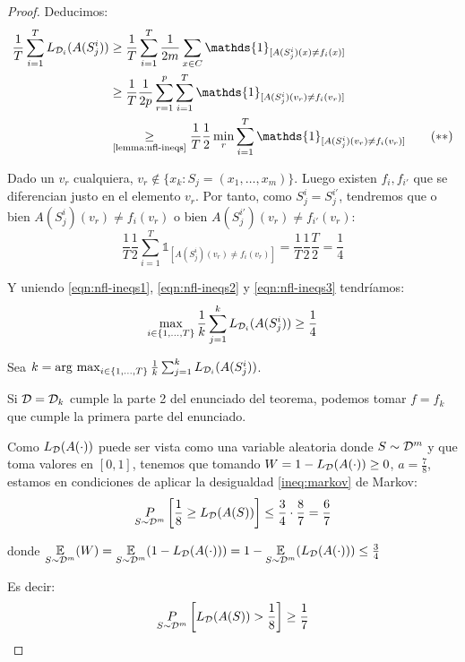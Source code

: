 \begin{proof}
Deducimos:
\begin{align}
\frac{1}{T} \sum_{i=1}^{T}  L_{\dist_i} (A(S_j^i)) &\ge
\frac{1}{T} \sum_{i=1}^{T}  \frac{1}{2m} \sum_{x \in C} \mathds{1}_{[A(S^i_j)(x) \neq f_i(x)]}\nonumber\\
&\ge \frac{1}{T} \frac{1}{2p} \sum_{r=1}^p \sum_{i=1}^{T}  \mathds{1}_{[A(S^i_j)(v_r) \neq f_i(v_r)]} \nonumber\\
&\underset{\textrm{\ref{lemma:nfl-ineqs}}}{\ge} \frac{1}{T} \frac{1}{2} \min_{r} \sum_{i=1}^{T}  \mathds{1}_{[A(S^i_j)(v_r) \neq f_i(v_r)]} 
\label{eqn:nfl-ineqs2}\tag{$\ast$$\ast$}
\end{align}


Dado un $v_r$ cualquiera, $v_r \notin \bigg\{x_k: S_j = (x_1, \ldots, x_m)\bigg\}$. Luego existen 
$f_i, f_{i'}$ que se diferencian justo en el elemento $v_r$. Por tanto, como $S_j^i = S_j^{i'}$,
tendremos que o bien $A(S^i_j)(v_r) \neq f_i(v_r)$ o bien $A(S^{i'}_j)(v_r) \neq f_{i'}(v_r)$:
\begin{equation}
\frac{1}{T} \frac{1}{2} \sum_{i=1}^{T}  \mathds{1}_{[A(S^i_j)(v_r) \neq f_i(v_r)]} = 
  \frac{1}{T} \frac{1}{2} \frac{T}{2} = \frac{1}{4}
\label{eqn:nfl-ineqs3}\tag{$\ast$$\ast$$\ast$}
\end{equation}

Y uniendo \eqref{eqn:nfl-ineqs1}, \eqref{eqn:nfl-ineqs2} y \eqref{eqn:nfl-ineqs3} tendríamos:
\[
  \max_{i \in \{1,\ldots, T\}} \frac{1}{k} \sum_{j=1}^{k} L_{\mathcal{D}_i} (A(S_j^i)) \ge \frac{1}{4}
\]

Sea $k = \operatorname*{arg\,\max}_{i \in \{1,\ldots, T\}} \frac{1}{k} \sum_{j=1}^{k} L_{\mathcal{D}_i} (A(S_j^i))$.

Si $\mathcal{D} = \mathcal{D}_k$ cumple la parte 2 del enunciado del teorema, podemos tomar $f=f_k$ que cumple la primera
parte del enunciado.

Como $L_{\mathcal{D}} (A(\cdot))$ puede ser vista como una variable aleatoria donde $S \sim \mathcal{D}^m$ y que toma
valores en $[0,1]$, tenemos que tomando $W = 1-L_{\mathcal{D}}(A(\cdot))\ge 0$, $a=\frac{7}{8}$, estamos en 
condiciones de aplicar la desigualdad \ref{ineq:markov} de Markov:
\[
  \underset{S\sim \mathcal{D}^m}{P} \left[\frac{1}{8} \ge L_{\mathcal{D}}(A(S)) \right] \le \frac{3}{4} \cdot \frac{8}{7} = \frac{6}{7}
\]

donde $\underset{S\sim \mathcal{D}^m}{\mathbb{E}}(W) = \underset{S\sim \mathcal{D}^m}{\mathbb{E}} (1 - L_{\mathcal{D}}(A(\cdot))) = 1 - \underset{S\sim \mathcal{D}^m}{\mathbb{E}} (L_{\mathcal{D}}(A(\cdot))) \le \frac{3}{4}$

Es decir:
\[
  \underset{S\sim \mathcal{D}^m}{P} \left[ L_{\mathcal{D}}(A(S)) > \frac{1}{8} \right] \ge \frac{1}{7}
\]
\end{proof}

